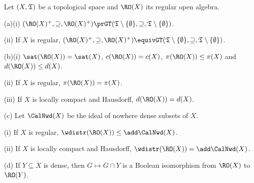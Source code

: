  Let $(X,\frak T)$ be a topological space and
$\RO(X)$ its regular open algebra.

(a)(i) $(\RO(X)^+,\supseteq,\RO(X)^+)
\prGT(\frak T\setminus\{\emptyset\},\supseteq,
\frak T\setminus\{\emptyset\})$.

\quad (ii) If $X$ is regular,
$(\RO(X)^+,\supseteq,\RO(X)^+)
\equivGT(\frak T\setminus\{\emptyset\},\supseteq,
\frak T\setminus\{\emptyset\})$.

(b)(i) $\sat(\RO(X))=\sat(X)$, $c(\RO(X))=c(X)$, $\pi(\RO(X))\le\pi(X)$ and
$d(\RO(X))\le d(X)$.

\quad(ii) If $X$ is regular, $\pi(\RO(X))=\pi(X)$.

\quad(iii) If $X$ is locally compact and Hausdorff, $d(\RO(X))=d(X)$.

(c) Let $\CalNwd(X)$ be the ideal of nowhere dense subsets of $X$.

\quad(i) If $X$ is regular, $\wdistr(\RO(X))\le\add\CalNwd(X)$.

\quad(ii) If $X$ is locally compact and Hausdorff,
$\wdistr(\RO(X))=\add\CalNwd(X)$.

(d) If $Y\subseteq X$ is dense, then $G\mapsto G\cap Y$ is a Boolean
isomorphism from $\RO(X)$ to $\RO(Y)$.

